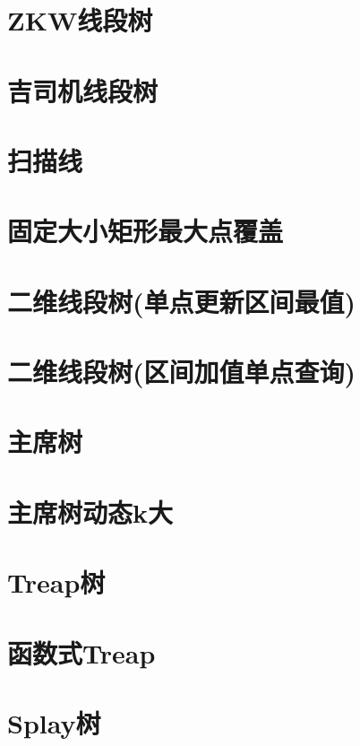 \section{ZKW线段树}
\raggedbottom
\hrulefill
\section{吉司机线段树}
\raggedbottom
\hrulefill
\section{扫描线}
\raggedbottom
\hrulefill
\section{固定大小矩形最大点覆盖}
\raggedbottom
\hrulefill
\section{二维线段树(单点更新区间最值)}
\raggedbottom
\hrulefill
\section{二维线段树(区间加值单点查询)}
\raggedbottom
\hrulefill
\section{主席树}
\raggedbottom
\hrulefill
\section{主席树动态k大}
\raggedbottom
\hrulefill
\section{Treap树}
\raggedbottom
\hrulefill
\section{函数式Treap}
\raggedbottom
\hrulefill
\section{Splay树}
\raggedbottom
\hrulefill
